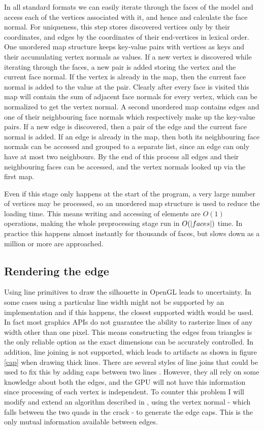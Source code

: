 \documentclass[a4paper, 12pt]{article}
\DeclarePairedDelimiter{\abs}{\lvert}{\rvert}
\begin{document}
In all standard formats we can easily iterate through the faces of the model and access each of the vertices associated with it, and hence and calculate the face normal. For uniqueness, this step stores discovered vertices only by their coordinates, and edges by the coordinates of their end-vertices in lexical order. One unordered map structure keeps key-value pairs with vertices as keys and their accumulating vertex normals as values. If a new vertex is discovered while iterating through the faces, a new pair is added storing the vertex and the current face normal. If the vertex is already in the map, then the current face normal is added to the value at the pair. Clearly after every face is visited this map will contain the sum of adjacent face normals for every vertex, which can be normalized to get the vertex normal. A second unordered map contains edges and one of their neighbouring face normals which respectively make up the key-value pairs. If a new edge is discovered, then a pair of the edge and the current face normal is added. If an edge is already in the map, then both its neighbouring face normals can be accessed and grouped to a separate list, since an edge can only have at most two neighbours. By the end of this process all edges and their neighbouring faces can be accessed, and the vertex normals looked up via the first map.

Even if this stage only happens at the start of the program, a very large number of vertices may be processed, so an unordered map structure is used to reduce the loading time. This means writing and accessing of elements are $O(1)$ operations, making the whole preprocessing stage run in $O(\abs{faces})$ time. In practice this happens almost instantly for thousands of faces, but slows down as a million or more are approached.


\subsection{Rendering the edge}
Using line primitives to draw the silhouette in OpenGL leads to uncertainty. In some cases using a particular line width might not be supported by an implementation and if this happens, the closest supported width would be used. In fact most graphics APIs do not guarantee the ability to rasterize lines of any width other than one pixel. This means constructing the edges from triangles is the only reliable option as the exact dimensions can be accurately controlled. In addition, line joining is not supported, which leads to artifacts as shown in figure \ref{cap} when drawing thick lines. There are several styles of line joins that could be used to fix this by adding caps between two lines \cite{Drakos1999}. However, they all rely on some knowledge about both the edges, and the GPU will not have this information since processing of each vertex is independent. To counter this problem I will modify and extend an algorithm described in \cite{Hughes2004}, using the vertex normal - which falls between the two quads in the crack - to generate the edge caps. This is the only mutual information available between edges.
\end{document}
